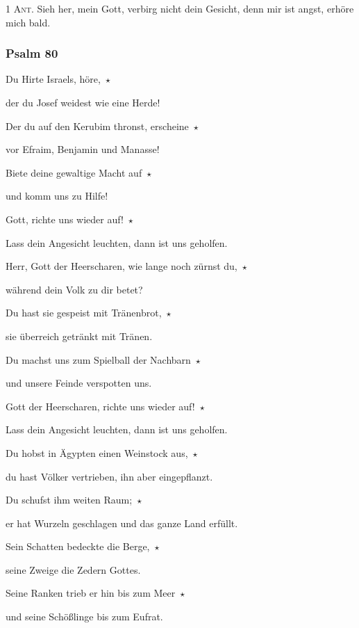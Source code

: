 \noindent \textsc{1 Ant.} Sieh her, mein Gott, verbirg nicht dein Gesicht, denn mir ist angst, erhöre mich bald.

\subsubsection{Psalm 80}

\noindent Du Hirte Israels, höre,~$\star$~\nopagebreak

der du Josef weidest wie eine Herde!

\noindent Der du auf den Kerubim thronst, erscheine~$\star$~\nopagebreak

vor Efraim, Benjamin und Manasse!

\noindent Biete deine gewaltige Macht auf~$\star$~\nopagebreak

und komm uns zu Hilfe!

\noindent Gott, richte uns wieder auf!~$\star$~\nopagebreak

Lass dein Angesicht leuchten, dann ist uns geholfen.

\noindent Herr, Gott der Heerscharen, wie lange noch zürnst du,~$\star$~\nopagebreak

während dein Volk zu dir betet?

\noindent Du hast sie gespeist mit Tränenbrot,~$\star$~\nopagebreak

sie überreich getränkt mit Tränen.

\noindent Du machst uns zum Spielball der Nachbarn~$\star$~\nopagebreak

und unsere Feinde verspotten uns.

\noindent Gott der Heerscharen, richte uns wieder auf!~$\star$~\nopagebreak

Lass dein Angesicht leuchten, dann ist uns geholfen.

\noindent Du hobst in Ägypten einen Weinstock aus,~$\star$~\nopagebreak

du hast Völker vertrieben, ihn aber eingepflanzt.

\noindent Du schufst ihm weiten Raum;~$\star$~\nopagebreak

er hat Wurzeln geschlagen und das ganze Land erfüllt.

\noindent Sein Schatten bedeckte die Berge,~$\star$~\nopagebreak

seine Zweige die Zedern Gottes.

\noindent Seine Ranken trieb er hin bis zum Meer~$\star$~\nopagebreak

und seine Schößlinge bis zum Eufrat.

